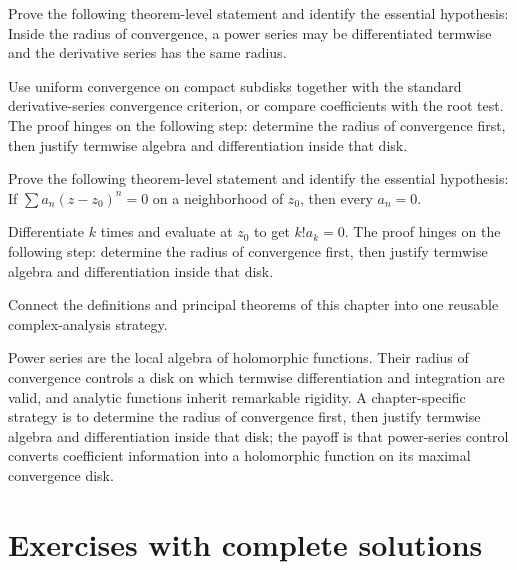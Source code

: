 \begin{problem}\label{prob:iv03-problem-10}
Prove the following theorem-level statement and identify the essential hypothesis: Inside the radius of convergence, a power series may be differentiated termwise and the derivative series has the same radius.
\end{problem}
\begin{solution}
Use uniform convergence on compact subdisks together with the standard derivative-series convergence criterion, or compare coefficients with the root test. The proof hinges on the following step: determine the radius of convergence first, then justify termwise algebra and differentiation inside that disk.
\end{solution}

\begin{problem}\label{prob:iv03-problem-11}
Prove the following theorem-level statement and identify the essential hypothesis: If $\sum a_n(z-z_0)^n=0$ on a neighborhood of $z_0$, then every $a_n=0$.
\end{problem}
\begin{solution}
Differentiate $k$ times and evaluate at $z_0$ to get $k!a_k=0$. The proof hinges on the following step: determine the radius of convergence first, then justify termwise algebra and differentiation inside that disk.
\end{solution}

\begin{problem}\label{prob:iv03-problem-12}
Connect the definitions and principal theorems of this chapter into one reusable complex-analysis strategy.
\end{problem}
\begin{solution}
Power series are the local algebra of holomorphic functions. Their radius of convergence controls a disk on which termwise differentiation and integration are valid, and analytic functions inherit remarkable rigidity. A chapter-specific strategy is to determine the radius of convergence first, then justify termwise algebra and differentiation inside that disk; the payoff is that power-series control converts coefficient information into a holomorphic function on its maximal convergence disk.
\end{solution}

\section{Exercises with complete solutions}

